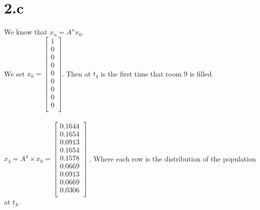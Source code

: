 \documentclass[letterpaper,12pt,titlepage,oneside,final]{book}
\begin{document}
\section*{2.c}
We know that $x_n = A^n x_0 $. \\
We set $
x_{0} = \begin{bmatrix}
   1\\
    0\\
   0\\
    0\\
   0\\
   0\\
   0\\
    0\\
   0\\ 
\end{bmatrix}$. 
Then at $t_4$ is the first time that room 9 is filled. 
\\
\\
$x_4 = A^4 \times x_0 = \begin{bmatrix}
    0.1644\\
    0.1654\\
    0.0913\\
    0.1654\\
    0.1578\\
    0.0669\\
    0.0913\\
    0.0669\\
    0.0306 \\
\end{bmatrix}$
. Where each row is the distribution of the population at $t_4$.

\cleardoublepage
\end{document}
